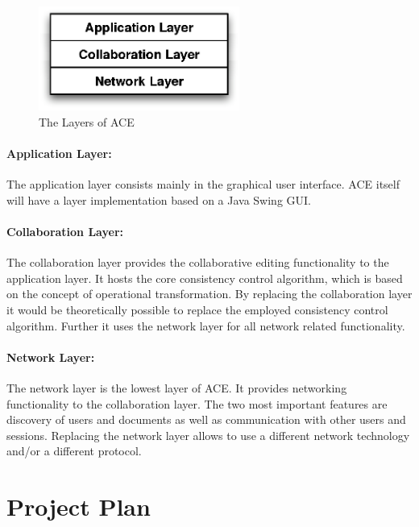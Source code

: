 \documentclass[11pt,a4paper]{article}
\begin{document}
\begin{figure}[H]
 \centering
 \includegraphics[width=6.6cm,height=3.42cm]{../images/layers.eps}
 \caption{The Layers of ACE}
\end{figure}

\paragraph{Application Layer:} The application layer consists mainly in the graphical
user interface. ACE itself will have a layer implementation based on a Java Swing GUI.

\paragraph{Collaboration Layer:} The collaboration layer provides the collaborative
editing functionality to the application layer. It hosts the core consistency
control algorithm, which is based on the concept of operational transformation.
By replacing the collaboration layer it would be theoretically possible to replace
the employed consistency control algorithm. Further it uses the network layer
for all network related functionality.

\paragraph{Network Layer:} The network layer is the lowest layer of ACE. It provides
networking functionality to the collaboration layer. The two most important features
are discovery of users and documents as well as communication with other users and
sessions. Replacing the network layer allows to use a different network technology 
and/or a different protocol.


\section{Project Plan}
\end{document}

